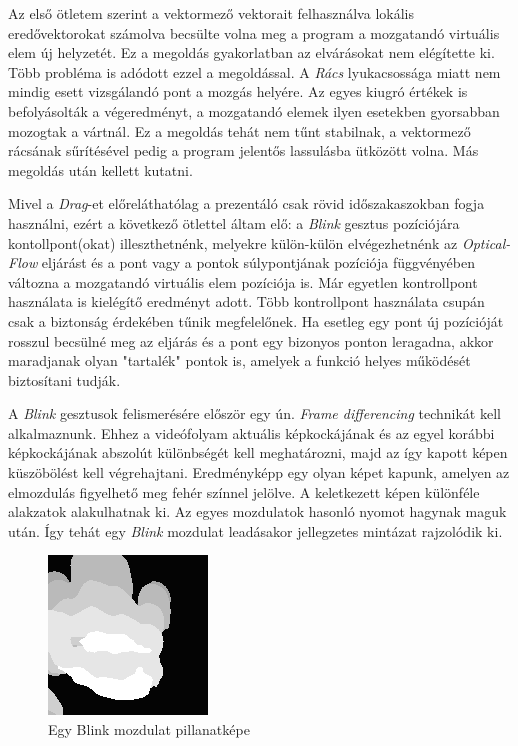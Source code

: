 Az első ötletem szerint a vektormező vektorait felhasználva lokális eredővektorokat számolva becsülte volna meg a program a mozgatandó virtuális elem új helyzetét. Ez a megoldás gyakorlatban az elvárásokat nem elégítette ki. Több probléma is adódott ezzel a megoldással. A \textit{Rács} lyukacsossága miatt nem mindig esett vizsgálandó pont a mozgás helyére. Az egyes kiugró értékek is befolyásolták a végeredményt, a mozgatandó elemek ilyen esetekben gyorsabban mozogtak a vártnál. Ez a megoldás tehát nem tűnt stabilnak, a vektormező rácsának sűrítésével pedig a program jelentős lassulásba ütközött volna. Más megoldás után kellett kutatni.

Mivel a \textit{Drag}-et előreláthatólag a prezentáló csak rövid időszakaszokban fogja használni, ezért a következő ötlettel áltam elő: a \textit{Blink} gesztus pozíciójára kontollpont(okat) illeszthetnénk, melyekre külön-külön elvégezhetnénk az \textit{Optical-Flow} eljárást és a pont vagy a pontok súlypontjának pozíciója függvényében változna a mozgatandó virtuális elem pozíciója is. Már egyetlen kontrollpont használata is kielégítő eredményt adott. Több kontrollpont használata csupán csak a biztonság érdekében tűnik megfelelőnek. Ha esetleg egy pont új pozícióját rosszul becsülné meg az eljárás és a pont egy bizonyos ponton leragadna, akkor maradjanak olyan "tartalék" pontok is, amelyek a funkció helyes működését biztosítani tudják.


A \textit{Blink} gesztusok felismerésére először egy ún. \textit{Frame differencing} technikát kell alkalmaznunk.
Ehhez a videófolyam aktuális képkockájának és az egyel korábbi képkockájának abszolút különbségét kell meghatározni, majd az így kapott képen küszöbölést kell végrehajtani. Eredményképp egy olyan képet kapunk, amelyen az elmozdulás figyelhető meg fehér színnel jelölve. A keletkezett képen különféle alakzatok alakulhatnak ki. Az egyes mozdulatok hasonló nyomot hagynak maguk után. Így tehát egy \textit{Blink} mozdulat leadásakor jellegzetes mintázat rajzolódik ki.

\begin{figure}[h]
\centering
\includegraphics[width=5truecm, height=5truecm]{images/Grab_screenshot.png}
\caption{Egy Blink mozdulat pillanatképe}
\label{fig:heatmap}
\end{figure}

